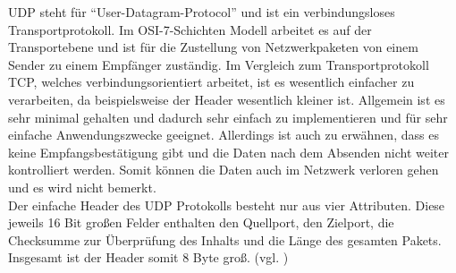 UDP steht für ``User-Datagram-Protocol'' und ist ein verbindungsloses Transportprotokoll. Im OSI-7-Schichten Modell arbeitet es auf der Transportebene und ist für die Zustellung von Netzwerkpaketen von einem Sender zu einem Empfänger zuständig. Im Vergleich zum Transportprotokoll TCP, welches verbindungsorientiert arbeitet, ist es wesentlich einfacher zu verarbeiten, da beispielsweise der Header wesentlich kleiner ist. Allgemein ist es sehr minimal gehalten und dadurch sehr einfach zu implementieren und für sehr einfache Anwendungszwecke geeignet. Allerdings ist auch zu erwähnen, dass es keine Empfangsbestätigung gibt und die Daten nach dem Absenden nicht weiter kontrolliert werden. Somit können die Daten auch im Netzwerk verloren gehen und es wird nicht bemerkt. \\

Der einfache Header des UDP Protokolls besteht nur aus vier Attributen. Diese jeweils 16 Bit großen Felder enthalten den Quellport, den Zielport, die Checksumme zur Überprüfung des Inhalts und die Länge des gesamten Pakets. Insgesamt ist der Header somit 8 Byte groß. (vgl. \cite{ElektronikKompendium.}\cite{.}\cite{.23.02.2016})
 